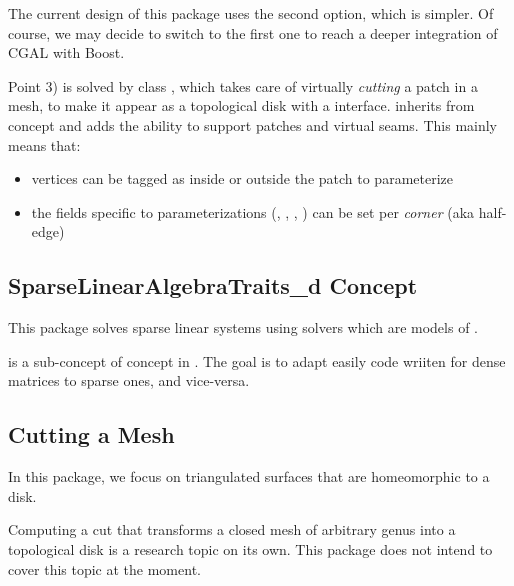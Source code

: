 The current design of this package uses the second option, which is simpler.
Of course, we may decide to switch to the first one to reach a deeper integration
of CGAL with Boost.

Point 3) is solved by class , 
which takes care of virtually {\em cutting}
a patch in a  mesh, to make it appear as a topological disk
with a  interface.
 inherits from concept  and adds
the ability to support patches and virtual seams.
This mainly means that:
\begin{itemize}
\item vertices can be tagged as inside or outside the patch to parameterize
\item the fields specific to parameterizations (, , , )
      can be set per {\em corner} (aka half-edge)
\end{itemize}


\subsection{SparseLinearAlgebraTraits\_d Concept}

This package solves sparse linear systems using solvers which are models
of .

 is a sub-concept of  concept
in .
The goal is to adapt easily code wriiten for dense matrices to sparse ones,
and vice-versa.


\subsection{Cutting a Mesh}

In this package, we focus on triangulated surfaces that are homeomorphic to a
disk.

Computing a cut that transforms a closed mesh of arbitrary genus into
a topological disk is a research topic on its own. This package does
not intend to cover this topic at the moment.



